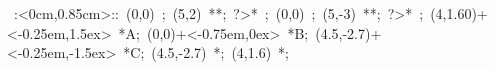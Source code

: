 \hbox{
\xy    <2cm,0cm>:<0cm,0.85cm>::
       (0,0) ; (5,2) **\dir{-}; ?>* \dir{>};
       (0,0) ; (5,-3) **\dir{-}; ?>* \dir{>}; 
	   (4,1.60)+<-0.25em,1.5ex> *{A};
       (0,0)+<-0.75em,0ex> *{B};
       (4.5,-2.7)+<-0.25em,-1.5ex> *{C};
       (4.5,-2.7) *{\bullet};
       (4,1.6) *{\bullet};
       \endxy}
	   
